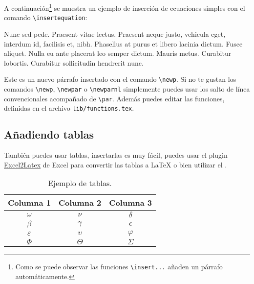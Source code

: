 		A continuación\footnote{Como se puede observar las funciones \texttt{\textbackslash insert...} añaden un párrafo automáticamente.} se muestra un ejemplo de inserción de ecuaciones simples con el comando \texttt{\textbackslash insertequation}:
		
		
		Nunc sed pede. Praesent vitae lectus. Praesent neque justo, vehicula eget, interdum id, facilisis et, nibh. Phasellus at purus et libero lacinia dictum. Fusce aliquet. Nulla eu ante placerat leo semper dictum. Mauris metus. Curabitur lobortis. Curabitur sollicitudin hendrerit nunc.
		
		\newp Este es un nuevo párrafo insertado con el comando \texttt{\textbackslash newp}. Si no te gustan los comandos \texttt{\textbackslash newp}, \texttt{\textbackslash newpar} o \texttt{\textbackslash newparnl} simplemente puedes usar los salto de línea convencionales acompañado de \texttt{\textbackslash par}. Además puedes editar las funciones, definidas en el archivo \texttt{lib/functions.tex}.
		
	\subsection{Añadiendo tablas}
		
		También puedes usar tablas, insertarlas es muy fácil, puedes usar el plugin \href{https://www.ctan.org/tex-archive/support/excel2latex/}{Excel2Latex} \cite{ref2} de Excel para convertir las tablas a \LaTeX\xspace o bien utilizar el  \cite{ref3}.
		
		\begin{table}[htbp]
			\centering
			\caption{Ejemplo de tablas.}
			\begin{tabular}{ccc}
				\hline
				\textbf{Columna 1} & \textbf{Columna 2} & \textbf{Columna 3} \bigstrut\\
				\hline
				$\omega$ & $\nu$ & $\delta$ \bigstrut[t]\\
				$\beta$ & $\gamma$ & $\epsilon$ \\
				$\varepsilon$ & $\upsilon$ & $\varphi$\\
				$\Phi$ & $\Theta$ & $\varSigma$ \bigstrut[b]\\
				\hline
			\end{tabular}
			\label{tab:tabla-1}
		\end{table}

